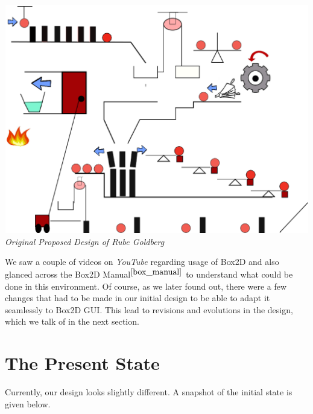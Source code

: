 \documentclass[a4paper,11pt]{article}
\begin{document}
\begin{center}
\includegraphics[width=160mm, height=100mm]{RubeGoldberg.eps}\\
\emph{Original Proposed Design of Rube Goldberg}
\end{center}

We saw a couple of videos on \emph{YouTube} regarding usage of Box2D and also glanced across the Box2D Manual$^{\cite{box_manual}}$ to understand what could be done in this environment. Of course, as we later found out, there were a few changes that had to be made in our initial design to be able to adapt it seamlessly to Box2D GUI. This lead to revisions and evolutions in the design, which we talk of in the next section.

\section{The Present State}

Currently, our design looks slightly different. A snapshot of the initial state is given below.
\end{document}

